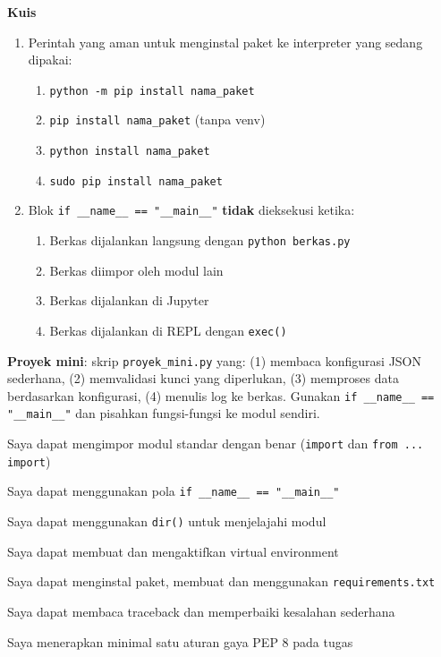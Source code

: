 \documentclass[../main.tex]{subfiles}
\begin{document}
\begin{asesmen}
\textbf{Kuis}

\begin{enumerate}
  \item Perintah yang aman untuk menginstal paket ke interpreter yang sedang dipakai:
  \begin{enumerate}
    \item \texttt{python -m pip install nama\_paket}
    \item \texttt{pip install nama\_paket} (tanpa venv)
    \item \texttt{python install nama\_paket}
    \item \texttt{sudo pip install nama\_paket}
  \end{enumerate}
  \item Blok \texttt{if \_\_name\_\_ == "\_\_main\_\_"} \textbf{tidak} dieksekusi ketika:
  \begin{enumerate}
    \item Berkas dijalankan langsung dengan \texttt{python berkas.py}
    \item Berkas diimpor oleh modul lain
    \item Berkas dijalankan di Jupyter
    \item Berkas dijalankan di REPL dengan \texttt{exec()}
  \end{enumerate}
\end{enumerate}

\textbf{Proyek mini}: skrip \texttt{proyek\_mini.py} yang: (1) membaca konfigurasi JSON sederhana, (2) memvalidasi kunci yang diperlukan, (3) memproses data berdasarkan konfigurasi, (4) menulis log ke berkas. Gunakan \texttt{if \_\_name\_\_ == "\_\_main\_\_"} dan pisahkan fungsi-fungsi ke modul sendiri.
\end{asesmen}

\begin{checklist}
  \item Saya dapat mengimpor modul standar dengan benar (\texttt{import} dan \texttt{from ... import})
  \item Saya dapat menggunakan pola \texttt{if \_\_name\_\_ == "\_\_main\_\_"}
  \item Saya dapat menggunakan \texttt{dir()} untuk menjelajahi modul
  \item Saya dapat membuat dan mengaktifkan virtual environment
  \item Saya dapat menginstal paket, membuat dan menggunakan \texttt{requirements.txt}
  \item Saya dapat membaca traceback dan memperbaiki kesalahan sederhana
  \item Saya menerapkan minimal satu aturan gaya PEP 8 pada tugas
\end{checklist}
\end{document}
